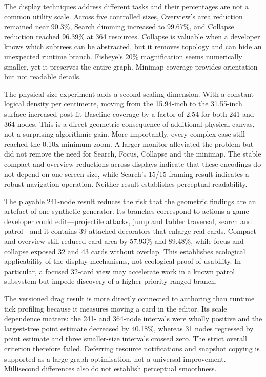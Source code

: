 The display techniques address different tasks and their percentages are not a common utility scale. Across five controlled sizes, Overview's area reduction remained near 90.3\%, Search dimming increased to 99.67\%, and Collapse reduction reached 96.39\% at 364 resources. Collapse is valuable when a developer knows which subtrees can be abstracted, but it removes topology and can hide an unexpected runtime branch. Fisheye's 20\% magnification seems numerically smaller, yet it preserves the entire graph. Minimap coverage provides orientation but not readable details.

The physical-size experiment adds a second scaling dimension. With a constant logical density per centimetre, moving from the 15.94-inch to the 31.55-inch surface increased post-fit Baseline coverage by a factor of 2.54 for both 241 and 364 nodes. This is a direct geometric consequence of additional physical canvas, not a surprising algorithmic gain. More importantly, every complex case still reached the 0.10x minimum zoom. A larger monitor alleviated the problem but did not remove the need for Search, Focus, Collapse and the minimap. The stable compact and overview reductions across displays indicate that these encodings do not depend on one screen size, while Search's 15/15 framing result indicates a robust navigation operation. Neither result establishes perceptual readability.

The playable 241-node result reduces the risk that the geometric findings are an artefact of one synthetic generator. Its branches correspond to actions a game developer could edit---projectile attacks, jump and ladder traversal, search and patrol---and it contains 39 attached decorators that enlarge real cards. Compact and overview still reduced card area by 57.93\% and 89.48\%, while focus and collapse exposed 32 and 43 cards without overlap. This establishes ecological applicability of the display mechanisms, not ecological proof of usability. In particular, a focused 32-card view may accelerate work in a known patrol subsystem but impede discovery of a higher-priority ranged branch.

The versioned drag result is more directly connected to authoring than runtime tick profiling because it measures moving a card in the editor. Its scale dependence matters: the 241- and 364-node intervals were wholly positive and the largest-tree point estimate decreased by 40.18\%, whereas 31 nodes regressed by point estimate and three smaller-size intervals crossed zero. The strict overall criterion therefore failed. Deferring resource notifications and snapshot copying is supported as a large-graph optimisation, not a universal improvement. Millisecond differences also do not establish perceptual smoothness.


